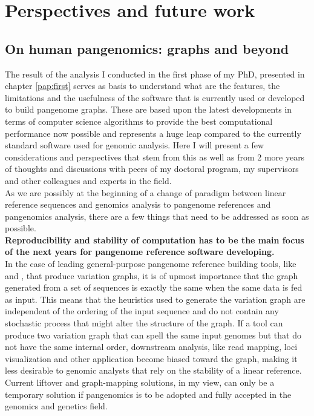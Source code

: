 
\chapter{Perspectives and future work}
\label{sec:perspectives}

\section{On human pangenomics: graphs and beyond}
The result of the analysis I conducted in the first phase of my PhD, presented in chapter \ref{pap:first} serves as basis to understand what are the features, the limitations and the usefulness of the software that is currently used or developed to build pangenome graphs. These are based upon the latest developments in terms of computer science algorithms to provide the best computational performance now possible and represents a huge leap compared to the currently standard software used for genomic analysis.
Here I will present a few considerations and perspectives that stem from this as well as from 2 more years of thoughts and discussions with peers of my doctoral program, my supervisors and other colleagues and experts in the field. \\
As we are possibly at the beginning of a change of paradigm between linear reference sequences and genomics analysis to pangenome references and pangenomics analysis, there are a few things that need to be addressed as soon as possible. \\
\textbf{Reproducibility and stability of computation has to be the main focus of the next years for pangenome reference software developing. \\}
In the case of leading general-purpose pangenome reference building tools, like \pggb and \mcactus, that produce variation graphs, it is of upmost importance that the graph generated from a set of sequences is exactly the same when the same data is fed as input. This means that the heuristics used to generate the variation graph are independent of the ordering of the input sequence and do not contain any stochastic process that might alter the structure of the graph. If a tool can produce two variation graph that can spell the same input genomes but that do not have the same internal order, downstream analysis, like read mapping, loci visualization and other application become biased toward the graph, making it less desirable to genomic analysts that rely on the stability of a linear reference. Current liftover and graph-mapping solutions, in my view, can only be a temporary solution if pangenomics is to be adopted and fully accepted in the genomics and genetics field. \\
